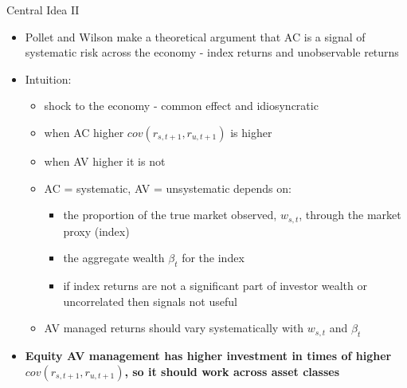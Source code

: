 \documentclass{beamer}
\begin{document}
\begin{frame}{Central Idea II}
	\begin{itemize}[<+->]
		\item Pollet and Wilson make a theoretical argument that AC is a signal of systematic risk across the economy - index returns and unobservable returns
		\item Intuition:
		\begin{itemize}[<+->]
			\item shock to the economy - common effect and idiosyncratic
			\item when AC higher $cov(r_{s,t+1},r_{u,t+1})$ is higher
			\item when AV higher it is not
			\item AC = systematic, AV = unsystematic depends on:
			\begin{itemize}[<+->]
				\item the proportion of the true market observed, $w_{s,t}$, through the market proxy (index)
				\item the aggregate wealth $\beta_{t}$ for the index
				\item if index returns are not a significant part of investor wealth or uncorrelated then signals not useful
			\end{itemize}
			\item AV managed returns should vary systematically with $w_{s,t}$ and $\beta_{t}$
		\end{itemize}
		\item \textbf{Equity AV management has higher investment in times of higher $cov(r_{s,t+1},r_{u,t+1})$, so it should work across asset classes}
	\end{itemize}
\end{frame}

\end{document}
